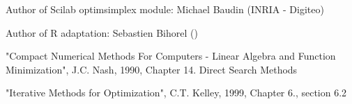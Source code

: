 %
\begin{Author}\relax
Author of Scilab optimsimplex module: Michael Baudin (INRIA - Digiteo)

Author of R adaptation: Sebastien Bihorel ()
\end{Author}
%
\begin{References}\relax
"Compact Numerical Methods For Computers - Linear Algebra and Function
Minimization", J.C. Nash, 1990, Chapter 14. Direct Search Methods

"Iterative Methods for Optimization", C.T. Kelley, 1999, Chapter 6., section
6.2
\end{References}
%
\begin{SeeAlso}\relax
{}
\end{SeeAlso}
